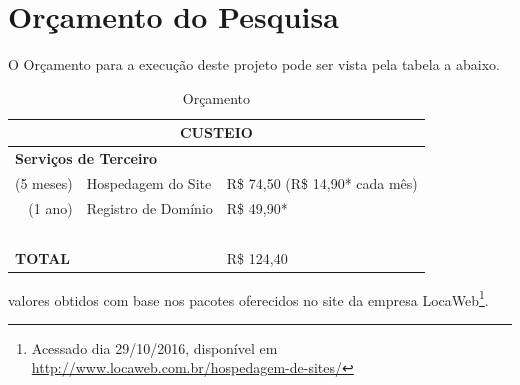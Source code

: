 \documentclass[
	12pt,				%
	openany,
	oneside,
	a4paper,			%
	english,			%
	brazil,				%
	]{abntex2}
\begin{document}





\chapter{Orçamento do Pesquisa}

O Orçamento para a execução deste projeto pode ser vista pela tabela a abaixo.
\begin{table}[H]
  \caption{Orçamento}
  \centering
  \begin{tabular}{|r l|l|}
    \hline 
    \multicolumn{3}{|c|}{\textsc{CUSTEIO}} \\ 
    \hline 
    \multicolumn{3}{|l|}{\textbf{Serviços de Terceiro}} \\ 
    \hline 
    (5 meses) & Hospedagem do Site & R\$ 74,50 (R\$ 14,90* cada mês) \\ 
    \hline 
    (1 ano) & Registro de Domínio & R\$ 49,90*   \\ 
    \hline 
    \multicolumn{3}{|c|}{~} \\ 
    \hline 
    \multicolumn{2}{|l|}{\textbf{TOTAL}} & R\$ 124,40\\ 
    \hline 
  \end{tabular} 
  \label{tab:orcamento}
\end{table}

\noindent * valores obtidos com base nos pacotes oferecidos no site da empresa LocaWeb\footnote{Acessado dia 29/10/2016, disponível em \url{http://www.locaweb.com.br/hospedagem-de-sites/}}.






%
%
\end{document}
